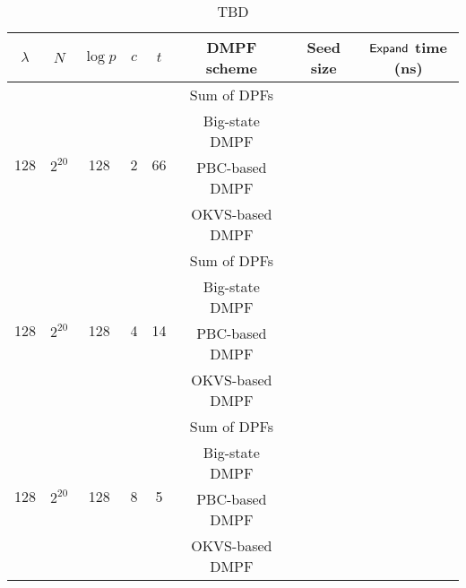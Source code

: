 \begin{table*}
\renewcommand\arraystretch{1.25}
\begin{threeparttable}
\caption{TBD}
\label{tab:application_PCG}
    \begin{tabular}{cccccccc}
    \toprule 
    $\lambda$ & $N$ & $\log p$& $c$ & $t$ & DMPF scheme & Seed size & ${\sf Expand}$ time (ns)\\
    

    \midrule
    \multirow{4}{*}{128} & \multirow{4}{*}{$2^{20}$}&
    \multirow{4}{*}{128}&
    \multirow{4}{*}{2}& \multirow{4}{*}{66}&
    Sum of DPFs & & \\\cline{6-8}
    & & & & &Big-state DMPF & & \\\cline{6-8}
    & & & & &PBC-based DMPF& & \\\cline{6-8}
    & & & & &OKVS-based DMPF & & \\
     
     \cline{1-8}

     \multirow{4}{*}{128} & \multirow{4}{*}{$2^{20}$}& 
     \multirow{4}{*}{128}&
     \multirow{4}{*}{4}& \multirow{4}{*}{14}
    &Sum of DPFs & & \\\cline{6-8}
    & & & & &Big-state DMPF & & \\\cline{6-8}
    & & & & &PBC-based DMPF& & \\\cline{6-8}
    & & & & &OKVS-based DMPF & & \\
     
     \cline{1-8}

     \multirow{4}{*}{128} & \multirow{4}{*}{$2^{20}$}& 
     \multirow{4}{*}{128}&
     \multirow{4}{*}{8}& \multirow{4}{*}{5}
    &Sum of DPFs & & \\\cline{6-8}
    & & & & &Big-state DMPF & & \\\cline{6-8}
    & & & & &PBC-based DMPF& & \\\cline{6-8}
    & & & & &OKVS-based DMPF & & \\

    \bottomrule
\end{tabular}	
\end{threeparttable}
\end{table*}

